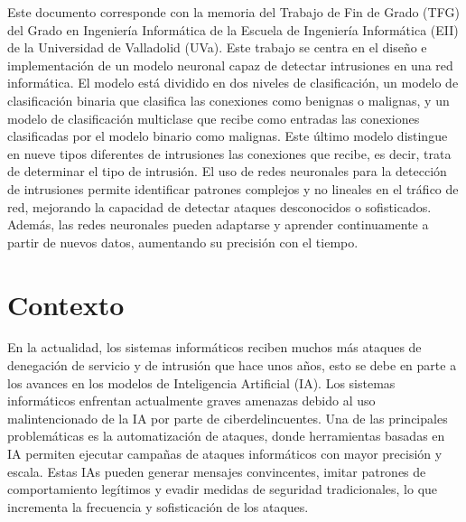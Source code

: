 Este documento corresponde con la memoria del Trabajo de Fin de Grado (TFG) del Grado en Ingeniería Informática de la Escuela de Ingeniería Informática (EII) de la Universidad de Valladolid (UVa). Este trabajo se centra en el diseño e implementación de un modelo neuronal capaz de detectar intrusiones en una red informática. El modelo está dividido en dos niveles de clasificación, un modelo de clasificación binaria que clasifica las conexiones como benignas o malignas, y un modelo de clasificación multiclase que recibe como entradas las conexiones clasificadas por el modelo binario como malignas. Este último modelo distingue en nueve tipos diferentes de intrusiones las conexiones que recibe, es decir, trata de determinar el tipo de intrusión. El uso de redes neuronales para la detección de intrusiones permite identificar patrones complejos y no lineales en el tráfico de red, mejorando la capacidad de detectar ataques desconocidos o sofisticados. Además, las redes neuronales pueden adaptarse y aprender continuamente a partir de nuevos datos, aumentando su precisión con el tiempo.


\section{Contexto} \label{sec.exp-problema}
En la actualidad, los sistemas informáticos reciben muchos más ataques de denegación de servicio y de intrusión que hace unos años, esto se debe en parte a los avances en los modelos de Inteligencia Artificial (IA). Los sistemas informáticos enfrentan actualmente graves amenazas debido al uso malintencionado de la IA por parte de ciberdelincuentes. Una de las principales problemáticas es la automatización de ataques, donde herramientas basadas en IA permiten ejecutar campañas de ataques informáticos con mayor precisión y escala. Estas IAs pueden generar mensajes convincentes, imitar patrones de comportamiento legítimos y evadir medidas de seguridad tradicionales, lo que incrementa la frecuencia y sofisticación de los ataques. 

